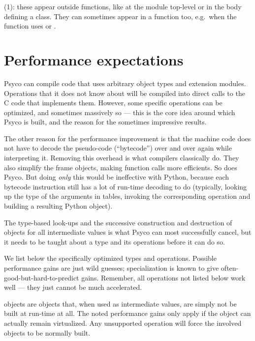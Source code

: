 \documentclass{manual}
\begin{document}
(1): these appear outside functions, like at the module top-level or in the body defining a class.  They can sometimes appear in a function too, e.g.\ when the function uses  or .


\chapter{Performance expectations}

Psyco can compile code that uses arbitrary object types and extension modules.  Operations that it does not know about will be compiled into direct calls to the C code that implements them.  However, some specific operations can be optimized, and sometimes massively so --- this is the core idea around which Psyco is built, and the reason for the sometimes impressive results.

The other reason for the performance improvement is that the machine code does not have to decode the pseudo-code (``bytecode'') over and over again while interpreting it.  Removing this overhead is what compilers classically do.  They also simplify the frame objects, making function calls more efficients.  So does Psyco.  But doing \emph{only} this would be ineffective with Python, because each bytecode instruction still has a lot of run-time decoding to do (typically, looking up the type of the arguments in tables, invoking the corresponding operation and building a resulting Python object).

The type-based look-ups and the successive construction and destruction of objects for all intermediate values is what Psyco can most successfully cancel, but it needs to be taught about a type and its operations before it can do so.

We list below the specifically optimized types and operations.  Possible performance gains are just wild guesses; specialization is known to give often-good-but-hard-to-predict gains.  Remember, all operations not listed below work well --- they just cannot be much accelerated.

 objects are objects that, when used as intermediate values, are simply not be built at run-time at all.  The noted performance gains only apply if the object can actually remain virtualized.  Any unsupported operation will force the involved objects to be normally built.
\end{document}
